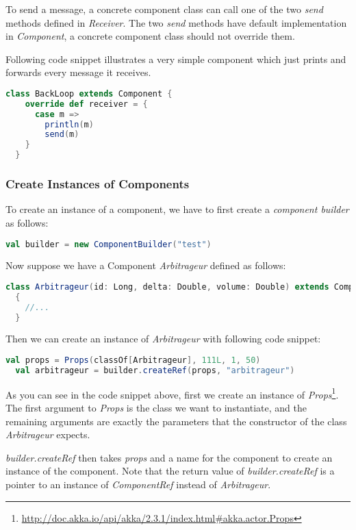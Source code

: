 To send a message, a concrete component class can call one of the two \emph{send} methods defined in \emph{Receiver}. The two \emph{send} methods have default implementation in \emph{Component}, a concrete component class should not override them.

Following code snippet illustrates a very simple component which just prints and forwards every message it receives.

\begin{lstlisting}[language=Scala]
  class BackLoop extends Component {
    override def receiver = {
      case m =>
        println(m)
        send(m)
    }
  }
\end{lstlisting}

\subsubsection{Create Instances of Components}

To create an instance of a component, we have to first create a \emph{component builder} as follows:

\begin{lstlisting}[language=Scala]
val builder = new ComponentBuilder("test")
\end{lstlisting}

Now suppose we have a Component \emph{Arbitrageur} defined as follows:

\begin{lstlisting}[language=Scala]
  class Arbitrageur(id: Long, delta: Double, volume: Double) extends Component
  {
    //...
  }
\end{lstlisting}

Then we can create an instance of \emph{Arbitrageur} with following code snippet:

\begin{lstlisting}[language=Scala]
  val props = Props(classOf[Arbitrageur], 111L, 1, 50)
  val arbitrageur = builder.createRef(props, "arbitrageur")
\end{lstlisting}

As you can see in the code snippet above, first we create an instance of \emph{Props}\footnote{\url{http://doc.akka.io/api/akka/2.3.1/index.html\#akka.actor.Props}}. The first argument to \emph{Props} is the class we want to instantiate, and the remaining arguments are exactly the parameters that the constructor of the class \emph{Arbitrageur} expects.

\emph{builder.createRef} then takes \emph{props} and a name for the component to create an instance of the component. Note that the return value of \emph{builder.createRef} is a pointer to an instance of \emph{ComponentRef} instead of \emph{Arbitrageur}.

